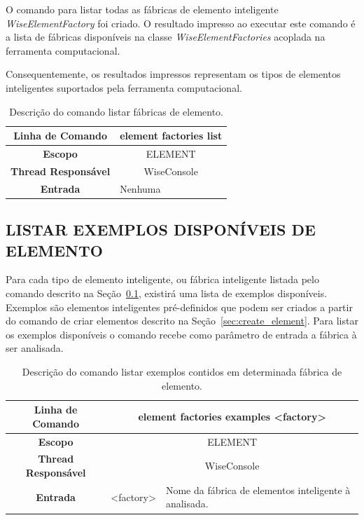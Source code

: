 O comando para listar todas as fábricas de elemento inteligente \textit{WiseElementFactory} foi criado. O resultado impresso ao executar este comando é a lista de fábricas disponíveis na classe \textit{WiseElementFactories} acoplada na ferramenta computacional.

Consequentemente, os resultados impressos representam os tipos de elementos inteligentes suportados pela ferramenta computacional.

\begin{center}
	\begin{table}[!htbp]
		\begin{tabularx}{\textwidth}{c|X}
			\toprule
			\textbf{Linha de Comando} & \multicolumn{1}{c}{element factories list} \\
			\midrule
			\textbf{Escopo} & \multicolumn{1}{c}{ELEMENT} \\
			\hline
			\textbf{Thread Responsável} & \multicolumn{1}{c}{WiseConsole} \\
			\hline
			\textbf{Entrada} & Nenhuma \\
			\bottomrule
		\end{tabularx}
		\caption{Descrição do comando listar fábricas de elemento.}
		\label{tab:list_element_factories}
	\end{table}
\end{center}

\subsection{LISTAR EXEMPLOS DISPONÍVEIS DE ELEMENTO}\label{sec:list_example_element_factories}

Para cada tipo de elemento inteligente, ou fábrica inteligente listada pelo comando descrito na Seção~\ref{sec:list_example_element_factories}, existirá uma lista de exemplos disponíveis. Exemplos são elementos inteligentes pré-definidos que podem ser criados a partir do comando de criar elementos descrito na Seção~\ref{sec:create_element}. Para listar os exemplos disponíveis o comando recebe como parâmetro de entrada a fábrica à ser analisada.

\begin{center}
	\begin{table}[!htbp]
		\begin{tabularx}{\textwidth}{c|c|X}
			\toprule
			\textbf{Linha de Comando} & \multicolumn{2}{c}{element factories examples <factory>} \\
			\midrule
			\textbf{Escopo} & \multicolumn{2}{c}{ELEMENT} \\
			\hline
			\textbf{Thread Responsável} & \multicolumn{2}{c}{WiseConsole} \\
			\hline
			\textbf{Entrada} & <factory> & Nome da fábrica de elementos inteligente à analisada. \\
			\bottomrule
		\end{tabularx}
		\caption{Descrição do comando listar exemplos contidos em determinada fábrica de elemento.}
		\label{tab:list_element_ex_factories}
	\end{table}
\end{center}


